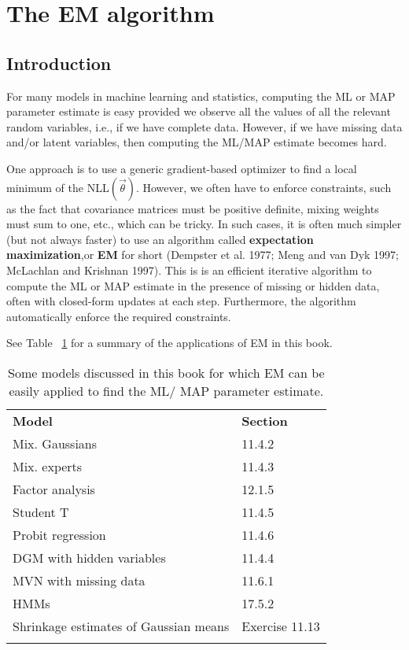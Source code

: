 \section{The EM algorithm}


\subsection{Introduction}
For many models in machine learning and statistics, computing the ML or MAP parameter estimate is easy provided we observe all the values of all the relevant random variables, i.e., if we have complete data. However, if we have missing data and/or latent variables, then computing the ML/MAP estimate becomes hard.

One approach is to use a generic gradient-based optimizer to find a local minimum of the NLL$(\vec{\theta})$. However, we often have to enforce constraints, such as the fact that covariance matrices must be positive definite, mixing weights must sum to one, etc., which can be tricky. In such cases, it is often much simpler (but not always faster) to use an algorithm called \textbf{expectation maximization},or \textbf{EM} for short (Dempster et al. 1977; Meng and van Dyk 1997; McLachlan and Krishnan 1997). This is is an efficient iterative algorithm to compute the ML or MAP estimate in the presence of missing or hidden data, often with closed-form updates at each step. Furthermore, the algorithm automatically enforce the required constraints.

See Table ~\ref{tab:summary-of-the-applications-of-EM} for a summary of the applications of EM in this book.

\begin{longtable}{ll}
\hline\noalign{\smallskip}
\textbf{Model} & \textbf{Section} \\
\noalign{\smallskip}\hline\noalign{\smallskip}
Mix. Gaussians & 11.4.2 \\
Mix. experts & 11.4.3 \\
Factor analysis & 12.1.5 \\
Student T & 11.4.5 \\
Probit regression & 11.4.6 \\
DGM with hidden variables & 11.4.4 \\
MVN with missing data & 11.6.1 \\
HMMs & 17.5.2 \\
Shrinkage estimates of Gaussian means & Exercise 11.13 \\
\noalign{\smallskip}\hline\noalign{\smallskip}
\caption{Some models discussed in this book for which EM can be easily applied to find the ML/ MAP parameter estimate.}\label{tab:summary-of-the-applications-of-EM} \\
\end{longtable}


